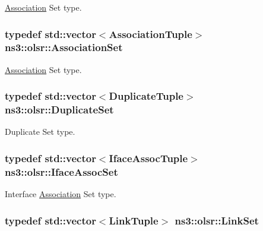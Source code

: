 \hyperlink{structns3_1_1olsr_1_1Association}{Association} Set type. 

\subsubsection[{\texorpdfstring{Association\+Set}{AssociationSet}}]{\setlength{\rightskip}{0pt plus 5cm}typedef std\+::vector$<${\bf Association\+Tuple}$>$ {\bf ns3\+::olsr\+::\+Association\+Set}}\hypertarget{namespacens3_1_1olsr_a35c0d7e5a941dd49e212f0c9e81ba466}{}\label{namespacens3_1_1olsr_a35c0d7e5a941dd49e212f0c9e81ba466}


\hyperlink{structns3_1_1olsr_1_1Association}{Association} Set type. 

\subsubsection[{\texorpdfstring{Duplicate\+Set}{DuplicateSet}}]{\setlength{\rightskip}{0pt plus 5cm}typedef std\+::vector$<${\bf Duplicate\+Tuple}$>$ {\bf ns3\+::olsr\+::\+Duplicate\+Set}}\hypertarget{namespacens3_1_1olsr_aef00689fee8c925dd464c5d1fee0dee9}{}\label{namespacens3_1_1olsr_aef00689fee8c925dd464c5d1fee0dee9}


Duplicate Set type. 

\subsubsection[{\texorpdfstring{Iface\+Assoc\+Set}{IfaceAssocSet}}]{\setlength{\rightskip}{0pt plus 5cm}typedef std\+::vector$<${\bf Iface\+Assoc\+Tuple}$>$ {\bf ns3\+::olsr\+::\+Iface\+Assoc\+Set}}\hypertarget{namespacens3_1_1olsr_af7456b9ea2cde8c7d88443de06c015f4}{}\label{namespacens3_1_1olsr_af7456b9ea2cde8c7d88443de06c015f4}


Interface \hyperlink{structns3_1_1olsr_1_1Association}{Association} Set type. 

\subsubsection[{\texorpdfstring{Link\+Set}{LinkSet}}]{\setlength{\rightskip}{0pt plus 5cm}typedef std\+::vector$<${\bf Link\+Tuple}$>$ {\bf ns3\+::olsr\+::\+Link\+Set}}\hypertarget{namespacens3_1_1olsr_a60381cc41d65a2e0daabd286077a378a}{}\label{namespacens3_1_1olsr_a60381cc41d65a2e0daabd286077a378a}


